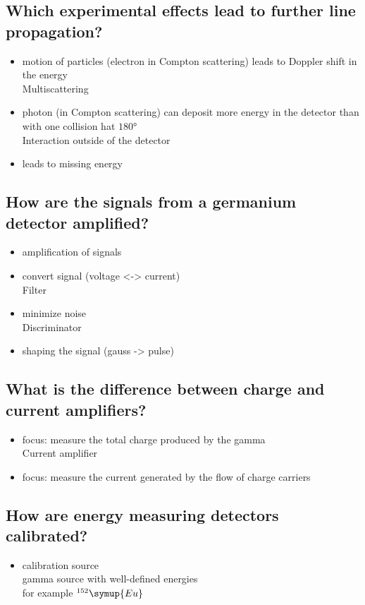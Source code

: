 \subsection*{Which experimental effects lead to further line 
propagation?}
\begin{itemize}
    Doppler Broadening
    \item motion of particles (electron in Compton scattering) leads to Doppler shift in the energy 
    \\
    Multiscattering
    \item photon (in Compton scattering) can deposit more energy in the detector than with one collision hat $180°$  
    \\
    Interaction outside of the detector
    \item leads to missing energy
\end{itemize}

\subsection*{How are the signals from a germanium detector amplified?}
\begin{itemize}
    Preamplification
    \item amplification of signals
    \item convert signal (voltage <-> current)
    \\
    Filter
    \item minimize noise
    \\
    Discriminator
    \item shaping the signal (gauss -> pulse)
\end{itemize}
\subsection*{What is the difference between charge and current 
amplifiers?}
\begin{itemize}
    Charge amplifier
    \item focus: measure the total charge produced by the gamma 
    \\
    Current amplifier
    \item focus: measure the current generated by the flow of charge carriers 
\end{itemize}

\subsection*{How are energy measuring detectors calibrated?}
\begin{itemize}
    \item calibration source \\
    \to gamma source with well-defined energies \\
    \to for example  $^{152}\symup{Eu}$
\end{itemize}


